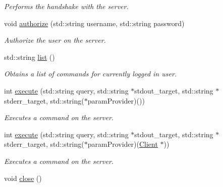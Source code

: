 \begin{DoxyCompactItemize}
\begin{DoxyCompactList}\small\item\em Performs the handshake with the server. \end{DoxyCompactList}\item 
void \hyperlink{class_r_c_f_1_1_client_1_1_client_ab08c9ae64d744de85a624a4161e1f8a2}{authorize} (std\+::string username, std\+::string password)
\begin{DoxyCompactList}\small\item\em Authorize the user on the server. \end{DoxyCompactList}\item 
std\+::string \hyperlink{class_r_c_f_1_1_client_1_1_client_ac2995dbb6dd0087d5eb8c874e74c3c6c}{list} ()
\begin{DoxyCompactList}\small\item\em Obtains a list of commands for currently logged in user. \end{DoxyCompactList}\item 
int \hyperlink{class_r_c_f_1_1_client_1_1_client_a47b9ab652ebbe6de0a104f797ce43a92}{execute} (std\+::string query, std\+::string $\ast$stdout\+\_\+target, std\+::string $\ast$stderr\+\_\+target, std\+::string($\ast$param\+Provider)())
\begin{DoxyCompactList}\small\item\em Executes a command on the server. \end{DoxyCompactList}\item 
int \hyperlink{class_r_c_f_1_1_client_1_1_client_a0e2e53ce56c010fb9552c8fa826d2efe}{execute} (std\+::string query, std\+::string $\ast$stdout\+\_\+target, std\+::string $\ast$stderr\+\_\+target, std\+::string($\ast$param\+Provider)(\hyperlink{class_r_c_f_1_1_client_1_1_client}{Client} $\ast$))
\begin{DoxyCompactList}\small\item\em Executes a command on the server. \end{DoxyCompactList}\item 
\hypertarget{class_r_c_f_1_1_client_1_1_client_a07c43c20e56147d36048c33849f8a343}{}void \hyperlink{class_r_c_f_1_1_client_1_1_client_a07c43c20e56147d36048c33849f8a343}{close} ()\label{class_r_c_f_1_1_client_1_1_client_a07c43c20e56147d36048c33849f8a343}


\end{DoxyCompactItemize}
